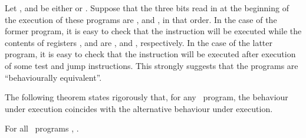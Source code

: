 \documentclass[fleqn]{llncs}
\begin{document}
\begin{example}
Let ,  and  be either  or .
Suppose that the three bits read in at the beginning of the execution of
these programs are ,  and , in that order.
In the case of the former program, it is easy to check that the
instruction  will be
executed while the contents of registers ,  and  are ,
 and , respectively.
In the case of the latter program, it is easy to check that the
instruction  will be executed after
execution of some test and jump instructions.
This strongly suggests that the programs are ``behaviourally
equivalent''.
\end{example}

The following theorem states rigorously that, for any \PGLDdii\ program,
the behaviour under execution coincides with the alternative behaviour
under execution.

\begin{theorem}
\label{theorem-behaviour}
For all \PGLDdii\ programs ,
.
\end{theorem}
\end{document}
